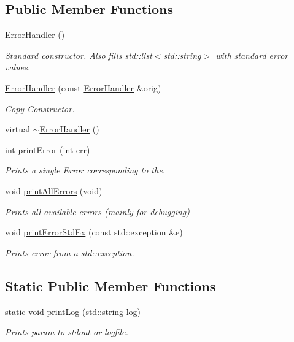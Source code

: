 \subsection*{Public Member Functions}
\begin{DoxyCompactItemize}
\item 
\mbox{\hyperlink{classErrorHandler_a7e5f379bd231442b898cef94556b2107}{Error\+Handler}} ()
\begin{DoxyCompactList}\small\item\em Standard constructor. Also fills std\+::list$<$std\+::string$>$ with standard error values. \end{DoxyCompactList}\item 
\mbox{\hyperlink{classErrorHandler_add20b373ee276ee2ef040f6dd913a86b}{Error\+Handler}} (const \mbox{\hyperlink{classErrorHandler}{Error\+Handler}} \&orig)
\begin{DoxyCompactList}\small\item\em Copy Constructor. \end{DoxyCompactList}\item 
virtual \mbox{\hyperlink{classErrorHandler_a73c7e690b864697e507aaeb537b3c3e5}{$\sim$\+Error\+Handler}} ()
\item 
int \mbox{\hyperlink{classErrorHandler_ab90b8248f24e3129df69d224585956dd}{print\+Error}} (int err)
\begin{DoxyCompactList}\small\item\em Prints a single Error corresponding to the. \end{DoxyCompactList}\item 
void \mbox{\hyperlink{classErrorHandler_a1108324c221544c928a2de3a2cf9ba98}{print\+All\+Errors}} (void)
\begin{DoxyCompactList}\small\item\em Prints all available errors (mainly for debugging) \end{DoxyCompactList}\item 
void \mbox{\hyperlink{classErrorHandler_ac36e4dd6e488718e7e07b2d03adf9f37}{print\+Error\+Std\+Ex}} (const std\+::exception \&e)
\begin{DoxyCompactList}\small\item\em Prints error from a std\+::exception. \end{DoxyCompactList}\end{DoxyCompactItemize}
\subsection*{Static Public Member Functions}
\begin{DoxyCompactItemize}
\item 
static void \mbox{\hyperlink{classErrorHandler_adefe2e5f3401006300884dd85a7c88ce}{print\+Log}} (std\+::string log)
\begin{DoxyCompactList}\small\item\em Prints param to stdout or logfile. \end{DoxyCompactList}\end{DoxyCompactItemize}
